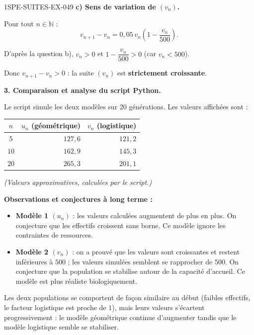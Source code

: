 \begin{corrige}{1SPE-SUITES-EX-049}
\textbf{c) Sens de variation de $(v_n)$.}

Pour tout $n \in \mathbb{N}$ :
\[
v_{n+1} - v_n = 0{,}05\,v_n\left(1 - \frac{v_n}{500}\right).
\]

D'après la question b), $v_n > 0$ et $1 - \dfrac{v_n}{500} > 0$ (car $v_n < 500$).

Donc $v_{n+1} - v_n > 0$ : la suite $(v_n)$ est \textbf{strictement croissante}.

\textbf{3. Comparaison et analyse du script Python.}

Le script simule les deux modèles sur 20 générations. Les valeurs affichées sont :

\begin{center}
\begin{tabular}{|c|r|r|}
\hline
$n$ & $u_n$ (géométrique) & $v_n$ (logistique) \\
\hline
$5$  & $127{,}6$ & $121{,}2$ \\
$10$ & $162{,}9$ & $145{,}3$ \\
$20$ & $265{,}3$ & $201{,}1$ \\
\hline
\end{tabular}
\end{center}

\textit{(Valeurs approximatives, calculées par le script.)}

\textbf{Observations et conjectures à long terme :}

\begin{itemize}
  \item \textbf{Modèle 1 $(u_n)$} : les valeurs calculées augmentent de plus en plus. On conjecture que les effectifs croissent sans borne. Ce modèle ignore les contraintes de ressources.

  \item \textbf{Modèle 2 $(v_n)$} : on a prouvé que les valeurs sont croissantes et restent inférieures à $500$ ; les valeurs simulées semblent se rapprocher de $500$. On conjecture que la population se stabilise autour de la capacité d'accueil. Ce modèle est plus réaliste biologiquement.
\end{itemize}


Les deux populations se comportent de façon similaire au début (faibles effectifs, le facteur logistique est proche de $1$), mais leurs valeurs s'écartent progressivement : le modèle géométrique continue d'augmenter tandis que le modèle logistique semble se stabiliser.


\end{corrige}

